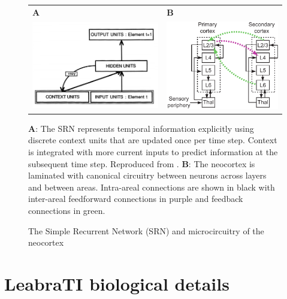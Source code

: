 \documentclass[dwyatte_dissertation.tex]{subfiles}
\begin{document}
\begin{figure}[h!]
\begin{center}
\begin{tabular}{ll}
\textbf{A} & \textbf{B} \\
\includegraphics[width=85mm]{figs/chap_leabrati/srn_scm.png} &
\includegraphics[width=75mm]{figs/chap_leabrati/microcircuit_horiz.pdf} \\
\end{tabular}
\end{center}
\caption{The Simple Recurrent Network (SRN) and microcircuitry of the neocortex}{\textbf{A}: The SRN represents temporal information explicitly using discrete context units that are updated once per time step. Context is integrated with more current inputs to predict information at the subsequent time step. Reproduced from \protect{}. \textbf{B}: The neocortex is laminated with canonical circuitry between neurons across layers and between areas. Intra-areal connections are shown in black with inter-areal feedforward connections in purple and feedback connections in green.}
\label{fig:srn_circuit}
\end{figure}

\section{LeabraTI biological details}
\end{document}
